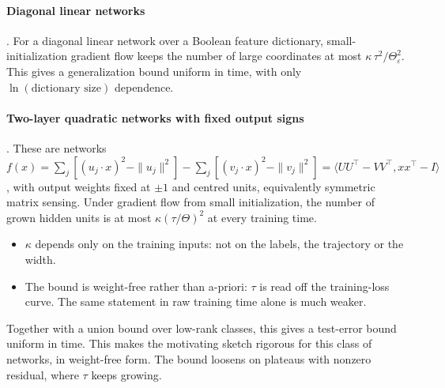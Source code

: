 \paragraph{Diagonal linear networks} . For a diagonal linear network over a Boolean feature dictionary, small-initialization gradient flow keeps the number of large coordinates at most $\kappa\,\tau^2/\Theta_\varepsilon^2$. This gives a generalization bound uniform in time, with only $\ln(\text{dictionary size})$ dependence.

\paragraph{Two-layer quadratic networks with fixed output signs} . These are networks $f(x)=\sum_j[(u_j\cdot x)^2-\|u_j\|^2]-\sum_j[(v_j\cdot x)^2-\|v_j\|^2]=\langle UU^\top-VV^\top,xx^\top-I\rangle$, with output weights fixed at $\pm1$ and centred units, equivalently symmetric matrix sensing. Under gradient flow from small initialization, the number of grown hidden units is at most $\kappa(\tau/\Theta)^2$ at every training time.
\begin{itemize}
\item $\kappa$ depends only on the training inputs: not on the labels, the trajectory or the width.
\item The bound is weight-free rather than a-priori: $\tau$ is read off the training-loss curve. The same statement in raw training time alone is much weaker.
\end{itemize}
Together with a union bound over low-rank classes, this gives a test-error bound uniform in time. This makes the motivating sketch rigorous for this class of networks, in weight-free form. The bound loosens on plateaus with nonzero residual, where $\tau$ keeps growing.

